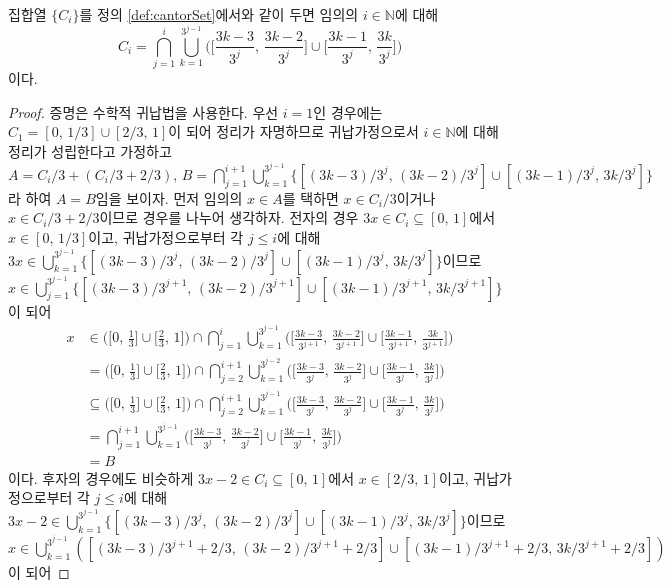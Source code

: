 \begin{theorem}\label{thm:cantorSeries}
    집합열 $\{C_i\}$를 정의 \ref{def:cantorSet}에서와 같이 두면 임의의 $i\in\mathbb{N}$에 대해
    \begin{equation*}
        C_i=\bigcap_{j=1}^i\bigcup_{k=1}^{3^{j-1}}\bigg(\bigg[\frac{3k-3}{3^j},\,\frac{3k-2}{3^j}\bigg]\cup\bigg[\frac{3k-1}{3^j},\,\frac{3k}{3^j}\bigg]\bigg)
    \end{equation*}
    이다.
\end{theorem}

\begin{proof}
    증명은 수학적 귀납법을 사용한다. 우선 $i=1$인 경우에는 $C_1=[0,\,1/3]\cup[2/3,\,1]$이 되어 정리가 자명하므로 귀납가정으로서 $i\in\mathbb{N}$에 대해 정리가 성립한다고 가정하고 $A=C_i/3+(C_i/3+2/3),\,B=\bigcap_{j=1}^{i+1}\bigcup_{k=1}^{3^{j-1}}\{[(3k-3)/3^j,\,(3k-2)/3^j]\cup[(3k-1)/3^j,\,3k/3^j]\}$라 하여 $A=B$임을 보이자. 먼저 임의의 $x\in A$를 택하면 $x\in C_i/3$이거나 $x\in C_i/3+2/3$이므로 경우를 나누어 생각하자. 전자의 경우 $3x\in C_i\subseteq[0,\,1]$에서 $x\in[0,\,1/3]$이고, 귀납가정으로부터 각 $j\leq i$에 대해 $3x\in\bigcup_{k=1}^{3^{j-1}}\{[(3k-3)/3^j,\,(3k-2)/3^j]\cup[(3k-1)/3^j,\,3k/3^j]\}$이므로 $x\in\bigcup_{j=1}^{3^{j-1}}\{[(3k-3)/3^{j+1},\,(3k-2)/3^{j+1}]\cup[(3k-1)/3^{j+1},\,3k/3^{j+1}]\}$이 되어
    \begin{align*}
        x&\in\bigg(\bigg[0,\,\frac{1}{3}\bigg]\cup\bigg[\frac{2}{3},\,1\bigg]\bigg)\cap\bigcap_{j=1}^i\bigcup_{k=1}^{3^{j-1}}\bigg(\bigg[\frac{3k-3}{3^{j+1}},\,\frac{3k-2}{3^{j+1}}\bigg]\cup\bigg[\frac{3k-1}{3^{j+1}},\,\frac{3k}{3^{j+1}}\bigg]\bigg)\\
        &=\bigg(\bigg[0,\,\frac{1}{3}\bigg]\cup\bigg[\frac{2}{3},\,1\bigg]\bigg)\cap\bigcap_{j=2}^{i+1}\bigcup_{k=1}^{3^{j-2}}\bigg(\bigg[\frac{3k-3}{3^j},\,\frac{3k-2}{3^j}\bigg]\cup\bigg[\frac{3k-1}{3^j},\,\frac{3k}{3^j}\bigg]\bigg)\\
        &\subseteq\bigg(\bigg[0,\,\frac{1}{3}\bigg]\cup\bigg[\frac{2}{3},\,1\bigg]\bigg)\cap\bigcap_{j=2}^{i+1}\bigcup_{k=1}^{3^{j-1}}\bigg(\bigg[\frac{3k-3}{3^j},\,\frac{3k-2}{3^j}\bigg]\cup\bigg[\frac{3k-1}{3^j},\,\frac{3k}{3^j}\bigg]\bigg)\\
        &=\bigcap_{j=1}^{i+1}\bigcup_{k=1}^{3^{j-1}}\bigg(\bigg[\frac{3k-3}{3^j},\,\frac{3k-2}{3^j}\bigg]\cup\bigg[\frac{3k-1}{3^j},\,\frac{3k}{3^j}\bigg]\bigg)\\
        &=B
    \end{align*}
    이다. 후자의 경우에도 비슷하게 $3x-2\in C_i\subseteq[0,\,1]$에서 $x\in[2/3,\,1]$이고, 귀납가정으로부터 각 $j\leq i$에 대해 $3x-2\in\bigcup_{k=1}^{3^{j-1}}\{[(3k-3)/3^j,\,(3k-2)/3^j]\cup[(3k-1)/3^j,\,3k/3^j]\}$이므로 $x\in\bigcup_{k=1}^{3^{j-1}}([(3k-3)/3^{j+1}+2/3,\,(3k-2)/3^{j+1}+2/3]\cup[(3k-1)/3^{j+1}+2/3,\,3k/3^{j+1}+2/3])$이 되어

\end{proof}
